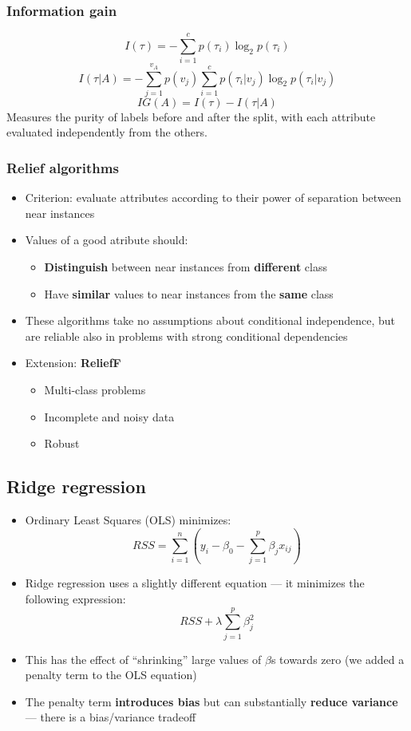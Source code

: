 \documentclass{article}
\begin{document}
        \subsubsection{Information gain}
        \[ I(\tau) = - \sum_{i=1}^{c} p(\tau_i) \log_2 p(\tau_i) \]
        \[ I(\tau \vert A) = - \sum_{j=1}^{v_A} p(v_j) \sum_{i=1}^{c} p(\tau_i \vert v_j) \log_2 p(\tau_i \vert v_j) \]
        \[ IG(A) = I(\tau) - I(\tau \vert A) \]
        Measures the purity of labels before and after the split, with each attribute evaluated independently from the others.

        \subsubsection{Relief algorithms}
        \begin{itemize}
            \item Criterion: evaluate attributes according to their power of separation between near instances
            \item Values of a good atribute should:
            \begin{itemize}
                \item \textbf{Distinguish} between near instances from \textbf{different} class
                \item Have \textbf{similar} values to near instances from the \textbf{same} class
            \end{itemize}
            \item These algorithms take no assumptions about conditional independence, but are reliable also in problems with strong conditional dependencies
            \item Extension: \textbf{ReliefF}
            \begin{itemize}
                \item Multi-class problems
                \item Incomplete and noisy data
                \item Robust
            \end{itemize}
        \end{itemize}

    \subsection{Ridge regression}
    \begin{itemize}
        \item Ordinary Least Squares (OLS) minimizes:
        \[ RSS = \sum_{i=1}^{n} \left(y_i - \beta_0 - \sum_{j=1}^{p} \beta_j x_{ij} \right) \]
        \item Ridge regression uses a slightly different equation --- it minimizes the following expression:
        \[ RSS + \lambda \sum_{j=1}^{p} \beta_j^2 \]
        \item This has the effect of ``shrinking'' large values of $\beta$s towards zero (we added a penalty term to the OLS equation)
        \item The penalty term \textbf{introduces bias} but can substantially \textbf{reduce variance} --- there is a bias/variance tradeoff
    \end{itemize}
\end{document}
